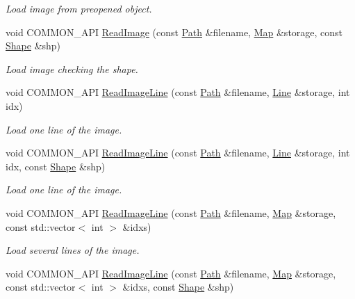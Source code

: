 \begin{DoxyCompactItemize}
\begin{DoxyCompactList}\small\item\em Load image from preopened object. \item\end{DoxyCompactList}\item 
void COMMON\_\-API \hyperlink{group__IO_ga90ec574d8eb47c429f7c9f0aeb84278e}{ReadImage} (const \hyperlink{classPath}{Path} \&filename, \hyperlink{group__Types_ga8747378c016fc11d9ecbb98787248c25}{Map} \&storage, const \hyperlink{group__Types_ga777964671cb4315ce8c56c920db031e3}{Shape} \&shp)
\begin{DoxyCompactList}\small\item\em Load image checking the shape. \item\end{DoxyCompactList}\item 
void COMMON\_\-API \hyperlink{group__IO_ga5703869a92557ac281a47e5e39a82a08}{ReadImageLine} (const \hyperlink{classPath}{Path} \&filename, \hyperlink{group__Types_ga4ce3fdeba27702c8b09a141e22709e38}{Line} \&storage, int idx)
\begin{DoxyCompactList}\small\item\em Load one line of the image. \item\end{DoxyCompactList}\item 
void COMMON\_\-API \hyperlink{group__IO_ga01e36107c55681c281619701e500251b}{ReadImageLine} (const \hyperlink{classPath}{Path} \&filename, \hyperlink{group__Types_ga4ce3fdeba27702c8b09a141e22709e38}{Line} \&storage, int idx, const \hyperlink{group__Types_ga777964671cb4315ce8c56c920db031e3}{Shape} \&shp)
\begin{DoxyCompactList}\small\item\em Load one line of the image. \item\end{DoxyCompactList}\item 
void COMMON\_\-API \hyperlink{group__IO_gad641a5bc8bbcb5e32e89f6b7f3e500cf}{ReadImageLine} (const \hyperlink{classPath}{Path} \&filename, \hyperlink{group__Types_ga8747378c016fc11d9ecbb98787248c25}{Map} \&storage, const std::vector$<$ int $>$ \&idxs)
\begin{DoxyCompactList}\small\item\em Load several lines of the image. \item\end{DoxyCompactList}\item 
void COMMON\_\-API \hyperlink{group__IO_ga7a36a289f1fc8b8cede62888cc27a962}{ReadImageLine} (const \hyperlink{classPath}{Path} \&filename, \hyperlink{group__Types_ga8747378c016fc11d9ecbb98787248c25}{Map} \&storage, const std::vector$<$ int $>$ \&idxs, const \hyperlink{group__Types_ga777964671cb4315ce8c56c920db031e3}{Shape} \&shp)

\end{DoxyCompactItemize}
